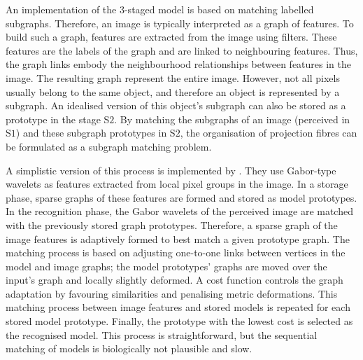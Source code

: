 

An implementation of the $3$-staged model is based on matching labelled subgraphs.
Therefore, an image is typically interpreted as a graph of features. To build such a graph, features are extracted from the image using filters. These features are the labels of the graph and are linked to neighbouring features. Thus, the graph links embody the neighbourhood relationships between features in the image.
The resulting graph represent the entire image. However, not all pixels usually belong to the same object, and therefore an object is represented by a subgraph.
An idealised version of this object's subgraph can also be stored as a prototype in the stage S$2$.
By matching the subgraphs of an image (perceived in S$1$) and these subgraph prototypes in S$2$, the organisation of projection fibres can be formulated as a subgraph matching problem.

A simplistic version of this process is implemented by . They use Gabor-type wavelets as features extracted from local pixel groups in the image. In a storage phase, sparse graphs of these features are formed and stored as model prototypes. In the recognition phase, the Gabor wavelets of the perceived image are matched with the previously stored graph prototypes. Therefore, a sparse graph of the image features is adaptively formed to best match a given prototype graph. The matching process is based on adjusting one-to-one links between vertices in the model and image graphs; the model prototypes' graphs are moved over the input's graph and locally slightly deformed. A cost function controls the graph adaptation by favouring similarities and penalising metric deformations. This matching process between image features and stored models is repeated for each stored model prototype. Finally, the prototype with the lowest cost is selected as the recognised model. This process is straightforward, but the sequential matching of models is biologically not plausible and slow.

